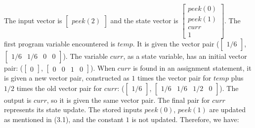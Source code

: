 \noindent The input vector is $\left [\begin{array} {c} peek(2) \end{array}
\right]$ and the state vector is $\left [\begin{array} {c} peek(0) \\ peek(1) \\ curr \\ 1 \end{array} \right]$. The first program
variable encountered is $temp$. It is given the vector pair ($\left [
\begin{array} {c} 1/6 \end{array} \right ]$, $\left [
\begin{array} {cccc} 1/6 & 1/6 & 0 & 0 \end{array} \right ]$). The
variable $curr$, as a state variable, has an initial vector pair:
($\left [ \begin{array} {c} 0 \end{array} \right ]$, $\left
[\begin{array} {cccc} 0 & 0 & 1 & 0
\end{array} \right ]$). When $curr$ is found in an assignment
statement, it is given a new vector pair, constructed as $1$ times
the vector pair for $temp$ plus $1/2$ times the old vector pair
for $curr$: ($\left [ \begin{array} {c} 1/6 \end{array} \right ]$,
$\left [ \begin{array} {cccc} 1/6 & 1/6 & 1/2 & 0 \end{array}
\right ]$). The output is $curr$, so it is given the same vector
pair. The final pair for $curr$ represents its state update. The
stored inputs $peek(0)$, $peek(1)$ are updated as mentioned in
(3.1), and the constant $1$ is not updated. Therefore, we have:
